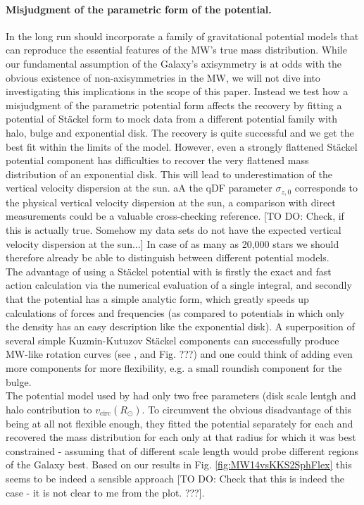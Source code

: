 \paragraph{Misjudgment of the parametric form of the potential.} In the long run \RM should incorporate a family of gravitational potential models that can reproduce the essential features of the MW's true mass distribution. While our fundamental assumption of the Galaxy's axisymmetry is at odds with the obvious existence of non-axisymmetries in the MW, we will not dive into investigating this implications in the scope of this paper. Instead we test how a misjudgment of the parametric potential form affects the recovery by fitting a potential of St\"{a}ckel form \citep{bat94} to mock data from a different potential family with halo, bulge and exponential disk. The recovery is quite successful and we get the best fit within the limits of the model. However, even a strongly flattened St\"{a}ckel potential component has difficulties to recover the very flattened mass distribution of an exponential disk. This will lead to underestimation of the vertical velocity dispersion at the sun. aA the qDF parameter $\sigma_{z,0}$ corresponds to the physical vertical velocity dispersion at the sun, a comparison with direct measurements could be a valuable cross-checking reference. [TO DO: Check, if this is actually true. Somehow my data sets do not have the expected vertical velocity dispersion at the sun...] In case of as many as 20,000 stars we should therefore already be able to distinguish between different potential models.
\\The advantage of using a St\"{a}ckel potential with \RM is firstly the exact and fast action calculation via the numerical evaluation of a single integral, and secondly that the potential has a simple analytic form, which greatly speeds up calculations of forces and frequencies (as compared to potentials in which only the density has an easy description like the exponential disk). A superposition of several simple Kuzmin-Kutuzov St\"{a}ckel components can successfully produce MW-like rotation curves (see \citet{bat94}, \citet{fam03} and Fig. ???) and one could think of adding even more components for more flexibility, e.g. a small roundish component for the bulge.
\\The potential model used by \citet{bov13} had only two free parameters (disk scale lentgh and halo contribution to $v_\text{circ}(R_\odot)$. To circumvent the obvious disadvantage of this being at all not flexible enough, they fitted the potential separately for each \MAP and recovered the mass distribution for each \MAP only at that radius for which it was best constrained - assuming that \MAPs of different scale length would probe different regions of the Galaxy best. Based on our results in Fig. \ref{fig:MW14vsKKS2SphFlex} this seems to be indeed a sensible approach [TO DO: Check that this is indeed the case - it is not clear to me from the plot. ???].
